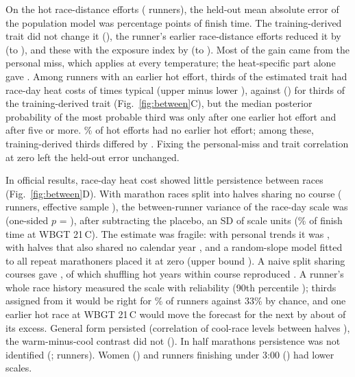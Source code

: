 \documentclass[12pt]{article}
\newcommand{\degC}{\,\textdegree C}
\begin{document}
On the \nEffHot{} hot race-distance efforts (\nEffHotRunners{} runners), the held-out mean absolute error of the population model was \cpMissPop{} percentage points of finish time. The training-derived trait did not change it (\cpTrainPrior), the runner's earlier race-distance efforts reduced it by \cpRaces{} (to \cpRacesVal), and these with the exposure index by \cpCombined{} (to \cpCombinedVal). Most of the gain came from the personal miss, which applies at every temperature; the heat-specific part alone gave \cpHeatOnly. Among runners with an earlier hot effort, thirds of the estimated trait had race-day heat costs of \groupsEarlier{} times typical (upper minus lower \gapEarlier), against \groupsTrain{} (\gapTrain) for thirds of the training-derived trait (Fig.~\ref{fig:between}C), but the median posterior probability of the most probable third was only \postOneRace{} after one earlier hot effort and \postFiveRaces{} after five or more. \shareNoEarlier\% of hot efforts had no earlier hot effort; among these, training-derived thirds differed by \gapNoEarlier. Fixing the personal-miss and trait correlation at zero left the held-out error unchanged.

In official results, race-day heat cost showed little persistence between races (Fig.~\ref{fig:between}D). With marathon races split into halves sharing no course (\persistRunners{} runners, effective sample \persistNeff), the between-runner variance of the race-day scale was \persistTau{} (one-sided $p$ = \persistP), \persistTauPlacebo{} after subtracting the placebo, an SD of \persistSD{} scale units (\persistPct\% of finish time at WBGT 21\degC). The estimate was fragile: with personal trends it was \persistTrend, with halves that also shared no calendar year \persistYear, and a random-slope model fitted to all \nRepeatMar{} repeat marathoners placed it at zero (upper bound \remlUpper). A naive split sharing courses gave \naiveTau, of which shuffling hot years within course reproduced \naiveP. A runner's whole race history measured the scale with reliability \persistRel{} (90th percentile \persistRelPninety); thirds assigned from it would be right for \persistTercile\% of runners against 33\% by chance, and one earlier hot race at WBGT 21\degC{} would move the forecast for the next by about \persistShrink{} of its excess. General form persisted (correlation of cool-race levels between halves \formCorr), the warm-minus-cool contrast did not (\contrastCorr). In half marathons persistence was not identified (\persistHalf; \persistHalfRunners{} runners). Women (\womenScale) and runners finishing under 3:00 (\subThreeScale) had lower scales.
\end{document}
